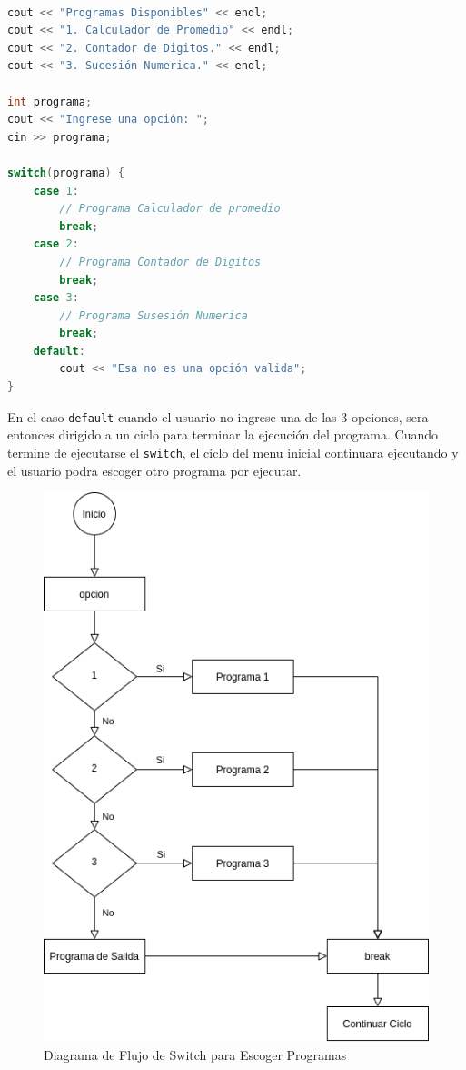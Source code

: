 \documentclass[12pt]{article}
\begin{document}
\begin{lstlisting}[language=c++]

cout << "Programas Disponibles" << endl;
cout << "1. Calculador de Promedio" << endl;
cout << "2. Contador de Digitos." << endl;
cout << "3. Sucesión Numerica." << endl;

int programa;
cout << "Ingrese una opción: ";
cin >> programa;

switch(programa) {
    case 1:
        // Programa Calculador de promedio
        break;
    case 2:
        // Programa Contador de Digitos
        break;
    case 3:
        // Programa Susesión Numerica
        break;
    default:
        cout << "Esa no es una opción valida";
}
\end{lstlisting}

En el caso \verb+default+ cuando el usuario no ingrese una de las 3 opciones, sera entonces dirigido a un ciclo para terminar la ejecución del programa. Cuando termine de ejecutarse el \verb+switch+, el ciclo del menu inicial continuara ejecutando y el usuario podra escoger otro programa por ejecutar.

\begin{figure}[h]
    \caption{Diagrama de Flujo de Switch para Escoger Programas}
    \centering
    \includegraphics[scale=0.7]{switch_menu.png}
\end{figure}
\end{document}

